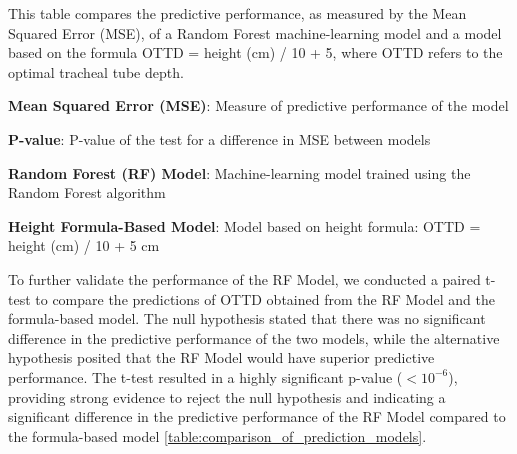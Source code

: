 \documentclass[11pt]{article}
\begin{document}
\begin{table}[h]
\caption{Comparison of Predictive Performance of Machine-Learning Model and Height Formula-Based Model}
\label{table:comparison_of_prediction_models}
\begin{threeparttable}
\renewcommand{\TPTminimum}{\linewidth}
\begin{tablenotes}
\footnotesize
\item This table compares the predictive performance, as measured by the Mean Squared Error (MSE), of a Random Forest machine-learning model and a model based on the formula OTTD = height (cm) / 10 + 5, where OTTD refers to the optimal tracheal tube depth.
\item \textbf{Mean Squared Error (MSE)}: Measure of predictive performance of the model
\item \textbf{P-value}: P-value of the test for a difference in MSE between models
\item \textbf{Random Forest (RF) Model}: Machine-learning model trained using the Random Forest algorithm
\item \textbf{Height Formula-Based Model}: Model based on height formula: OTTD = height (cm) / 10 + 5 cm
\end{tablenotes}
\end{threeparttable}
\end{table}


To further validate the performance of the RF Model, we conducted a paired t-test to compare the predictions of OTTD obtained from the RF Model and the formula-based model. The null hypothesis stated that there was no significant difference in the predictive performance of the two models, while the alternative hypothesis posited that the RF Model would have superior predictive performance. The t-test resulted in a highly significant p-value ($<$$10^{-6}$), providing strong evidence to reject the null hypothesis and indicating a significant difference in the predictive performance of the RF Model compared to the formula-based model \ref{table:comparison_of_prediction_models}.
\end{document}

